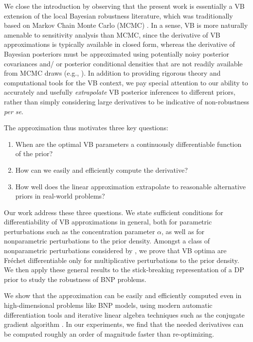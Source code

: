 We close the introduction by observing that  the present work is essentially a
VB extension of the local Bayesian robustness literature, which was
traditionally based on Markov Chain Monte Carlo (MCMC)
\citet{gustafson:1996:local, basu:1996:local}.  In a sense, VB is more naturally
amenable to sensitivity analysis than MCMC, since the derivative of VB
approximations is typically available in closed form, whereas the derivative of
Bayesian posteriors must be approximated using potentially noisy posterior
covariances and/ or posterior conditional densities that are not readily
available from MCMC draws (e.g., \citet{gustafson:1996:marginal}).  In addition
to providing rigorous theory and computational tools for the VB context, we pay
special attention to our ability to accurately and usefully \textit{extrapolate}
VB posterior inferences to different priors, rather than simply considering
large derivatives to be indicative of non-robustness \textit{per se}.


The approximation thus motivates three key questions:
%
\begin{enumerate}
%
\item {}
    When are the optimal VB parameters a continuously differentiable
    function of the prior?
%
\item {}
    How can we easily and efficiently compute the derivative?
%
\item {}
    How well does the linear approximation extrapolate to reasonable
    alternative priors in real-world problems?
%
\end{enumerate}

Our work address these three questions.  We state sufficient conditions for
differentiability of VB approximations in general, both for parametric
perturbations such as the concentration parameter $\alpha$, as well as for
nonparametric perturbations to the prior density.  Amongst a class of
nonparametric perturbations considered by \citet{gustafson:1996:local}, we prove
that VB optima are Fr{\'e}chet differentiable only for multiplicative
perturbations to the prior density.  We then apply these general results to the
stick-breaking representation of a DP prior to study the robustness of
BNP problems.

We show that the approximation can be easily and efficiently
computed even in high-dimensional problems like BNP models, using modern
automatic differentiation tools \citep{baydin:2018:automatic, jax2018github} and
iterative linear algebra techniques such as the conjugate gradient algorithm
\citep{nocedal:2006:numerical}.  In our experiments, we find that the  needed
derivatives can be computed roughly an order of magnitude faster than
re-optimizing.

